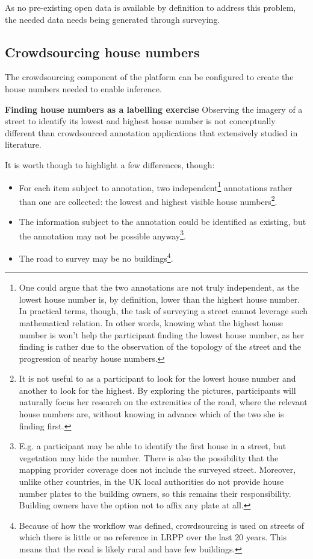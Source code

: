 As no pre-existing open data is available by definition to address this problem, the needed data needs being generated through surveying. 

\subsection{Crowdsourcing house numbers}

The crowdsourcing component of the platform can be configured to create the house numbers needed to enable inference. 

\textbf{Finding house numbers as a labelling exercise} Observing the imagery of a street to identify its lowest and highest house number is not conceptually different than crowdsourced annotation applications that extensively studied in literature. 

It is worth though to highlight a few differences, though:

\begin{itemize}
        
    \item For each item subject to annotation, two independent\footnote{One could argue that the two annotations are not truly independent, as the lowest house number is, by definition, lower than the highest house number. In practical terms, though, the task of surveying a street cannot leverage such mathematical relation. In other words, knowing what the highest house number is won't help the participant finding the lowest house number, as her finding is rather due to the observation of the topology of the street and the progression of nearby house numbers.} annotations rather than one are collected: the lowest and highest visible house numbers\footnote{It is not useful to as a participant to look for the lowest house number and another to look for the highest. By exploring the pictures, participants will naturally focus her research on the extremities of the road, where the relevant house numbers are, without knowing in advance which of the two she is finding first.}.
        
    \item The information subject to the annotation could be identified as existing, but the annotation may not be possible anyway\footnote{E.g. a participant may be able to identify the first house in a street, but vegetation may hide the number. There is also the possibility that the mapping provider coverage does not include the surveyed street. Moreover, unlike other countries, in the UK local authorities do not provide house number plates to the building owners, so this remains their responsibility. Building owners have the option not to affix any plate at all.}.
        
    \item The road to survey may be no buildings\footnote{Because of how the workflow was defined, crowdsourcing is used on streets of which there is little or no reference in LRPP over the last 20 years. This means that the road is likely rural and have few buildings.}.
        
\end{itemize}

